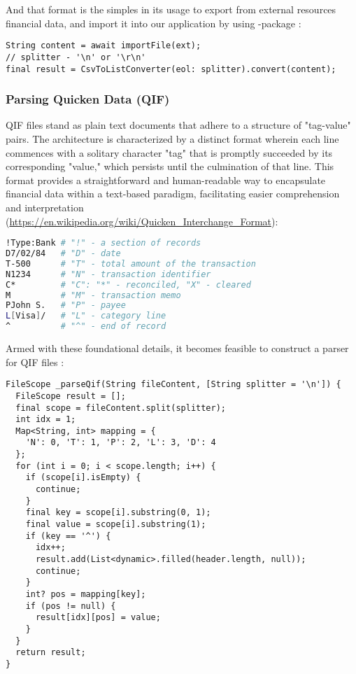 And that format is the simples in its usage to export from external resources financial data, and import it into our 
application by using -package :

\begin{lstlisting}
String content = await importFile(ext);
// splitter - '\n' or '\r\n'
final result = CsvToListConverter(eol: splitter).convert(content);
\end{lstlisting}


\subsubsection{Parsing Quicken Data (QIF)}

QIF files stand as plain text documents that adhere to a structure of "tag-value" pairs. The architecture is 
characterized by a distinct format wherein each line commences with a solitary character "tag" that is promptly 
succeeded by its corresponding "value," which persists until the culmination of that line. This format provides a 
straightforward and human-readable way to encapsulate financial data within a text-based paradigm, facilitating 
easier comprehension and interpretation
(\href{https://en.wikipedia.org/wiki/Quicken_Interchange_Format}{https://en.wikipedia.org/wiki/Quicken\_Interchange\_Format}):

\begin{lstlisting}[language=bash]
!Type:Bank # "!" - a section of records
D7/02/84   # "D" - date
T-500      # "T" - total amount of the transaction
N1234      # "N" - transaction identifier
C*         # "C": "*" - reconciled, "X" - cleared
M          # "M" - transaction memo
PJohn S.   # "P" - payee
L[Visa]/   # "L" - category line
^          # "^" - end of record
\end{lstlisting}

\noindent Armed with these foundational details, it becomes feasible to construct a parser for QIF files 
:

\begin{lstlisting}
FileScope _parseQif(String fileContent, [String splitter = '\n']) {
  FileScope result = [];
  final scope = fileContent.split(splitter);
  int idx = 1;
  Map<String, int> mapping = {
    'N': 0, 'T': 1, 'P': 2, 'L': 3, 'D': 4
  };
  for (int i = 0; i < scope.length; i++) {
    if (scope[i].isEmpty) {
      continue;
    }
    final key = scope[i].substring(0, 1);
    final value = scope[i].substring(1);
    if (key == '^') {
      idx++;
      result.add(List<dynamic>.filled(header.length, null));
      continue;
    }
    int? pos = mapping[key];
    if (pos != null) {
      result[idx][pos] = value;
    }
  }
  return result;
}
\end{lstlisting}


